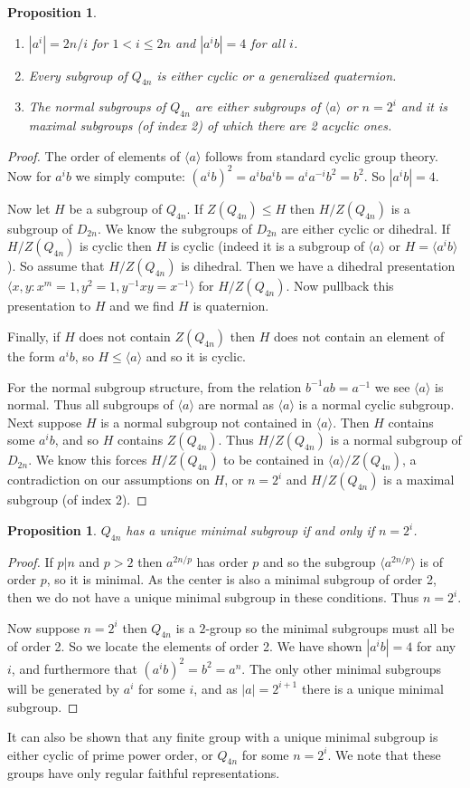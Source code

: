 \documentclass[12pt]{article}
\newtheorem{prop}[thm]{Proposition}
\begin{document}
\begin{prop}
\begin{enumerate}
\item $|a^i|=2n/i$ for $1<i\leq 2n$ and $|a^i b|=4$ for all $i$.
\item Every subgroup of $Q_{4n}$ is either cyclic or a generalized
quaternion.
\item The normal subgroups of $Q_{4n}$ are either subgroups of
$\langle a\rangle$ or $n=2^i$ and it is maximal subgroups (of index 2) of
which there are 2 acyclic ones.
\end{enumerate}
\end{prop}
\begin{proof}
The order of elements of $\langle a\rangle$ follows from standard cyclic group theory.
Now for $a^i b$ we simply compute: $(a^i b)^2=a^i b a^i b=a^i a^{-i} b^2=b^2$.
So $|a^i b|=4$.

Now let $H$ be a subgroup of $Q_{4n}$.  If $Z(Q_{4n})\leq H$ then $H/Z(Q_{4n})$ is
a subgroup of $D_{2n}$.  We know the subgroups of $D_{2n}$ are either cyclic or
dihedral.  If $H/Z(Q_{4n})$ is cyclic then $H$ is cyclic (indeed it is a subgroup
of $\langle a\rangle$ or $H=\langle a^i b\rangle$).  So assume that $H/Z(Q_{4n})$ is
dihedral.  Then we have a dihedral presentation 
$\langle x,y:x^m=1, y^2=1, y^{-1}xy=x^{-1}\rangle$ for $H/Z(Q_{4n})$.  Now pullback
this presentation to $H$ and we find $H$ is quaternion.  

Finally, if $H$ does not contain $Z(Q_{4n})$ then $H$ does not contain an element
of the form $a^i b$, so $H\leq \langle a\rangle$ and so it is cyclic.

For the normal subgroup structure, from the relation $b^{-1} ab=a^{-1}$ we
see $\langle a\rangle$ is normal.  Thus all subgroups of $\langle a\rangle$
are normal as $\langle a\rangle$ is a normal cyclic subgroup.  Next suppose
$H$ is a normal subgroup not contained in $\langle a\rangle$.  Then $H$ contains
some $a^i b$, and so $H$ contains $Z(Q_{4n})$.  Thus $H/Z(Q_{4n})$ is a normal
subgroup of $D_{2n}$.  We know this forces $H/Z(Q_{4n})$ to be contained in
$\langle a\rangle/Z(Q_{4n})$, a contradiction on our assumptions on $H$, or
$n=2^i$ and $H/Z(Q_{4n})$ is a maximal subgroup (of index 2).
\end{proof}

\begin{prop}
$Q_{4n}$ has a unique minimal subgroup if and only if $n=2^i$.
\end{prop}
\begin{proof}
If $p|n$ and $p>2$ then $a^{2n/p}$ has order $p$ and so the subgroup 
$\langle a^{2n/p}\rangle$ is of order $p$, so it is minimal.  As the center
is also a minimal subgroup of order 2, then we do not have a unique minimal subgroup
in these conditions.  Thus $n=2^i$.

Now suppose $n=2^i$ then $Q_{4n}$ is a $2$-group so the minimal subgroups must all
be of order 2.  So we locate the elements of order 2.  We have shown $|a^i b|=4$ for
any $i$, and furthermore that $(a^i b)^2=b^2=a^n$.  The only other minimal subgroups
will be generated by $a^i$ for some $i$, and as $|a|=2^{i+1}$ there is a unique minimal
subgroup.
\end{proof}

It can also be shown that any finite group with a unique minimal subgroup is either
cyclic of prime power order, or $Q_{4n}$ for some $n=2^i$.
  We note that these groups have only regular faithful representations.
\end{document}
